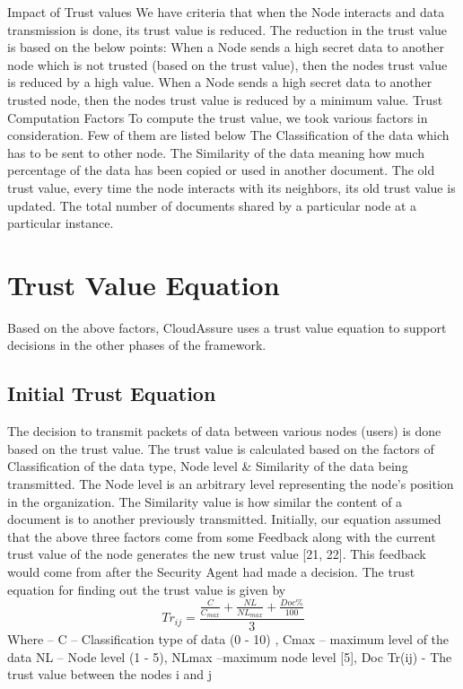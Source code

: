 Impact of Trust values
We have criteria that when the Node interacts and data transmission is done, its trust value is reduced. The reduction in the trust value is based on the below points:
	When a Node sends a high secret data to another node which is not trusted (based on the trust value), then the nodes trust value is reduced by a high value.
	When a Node sends a high secret data to another trusted node, then the nodes trust value is reduced by a minimum value.
Trust Computation Factors
To compute the trust value, we took various factors in consideration. Few of them are listed below
	The Classification of the data which has to be sent to other node.
	The Similarity of the data meaning how much percentage of the data has been copied or used in another document.
	The old trust value, every time the node interacts with its neighbors, its old trust value is updated.
	The total number of documents shared by a particular node at a particular instance.

    \section{Trust Value Equation}
Based on the above factors, CloudAssure uses a trust value equation to support decisions in the other phases of the framework. 


\subsection{Initial Trust Equation}
The decision to transmit packets of data between various nodes (users) is done
based on the trust value. The trust value is calculated based on the factors of
Classification of the data type, Node level \& Similarity of the data being transmitted. The Node level is an arbitrary level representing the node’s position in the organization. The Similarity value is how similar the content of a document is to another previously transmitted.
Initially, our equation assumed that the above three factors come from some Feedback along with the current trust value of the node generates the new trust value [21, 22]. This feedback would come from after the Security Agent had made a decision. The trust equation for finding out the trust value is given by
\begin{equation}
    Tr_{ij}=\frac{\frac{C}{C_{max}} + \frac{NL}{NL_{max}} + \frac{Doc\%}{100}}{3}
\end{equation}
Where – C – Classification type of data (0 - 10) , Cmax – maximum level of the data
NL – Node level   (1 - 5), NLmax –maximum node level [5], Doc %
Tr(ij)  - The trust value between the nodes i and j

